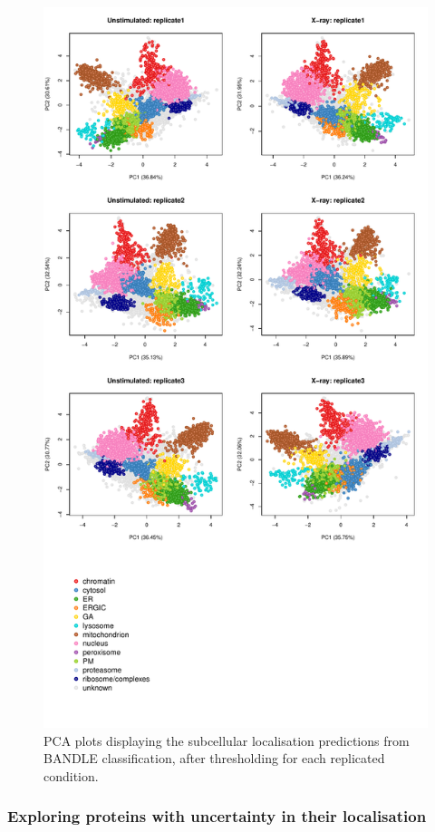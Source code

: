 \documentclass[9pt,a4paper,]{extarticle}
\begin{document}
\begin{figure}[H]

{\centering \includegraphics[width=0.8\linewidth,]{figs/bandle_prediction_maps} 

}

\caption{PCA plots displaying the subcellular localisation predictions from BANDLE classification, after thresholding for each replicated condition.}\label{fig:plot-pcas-bandle-all}
\end{figure}

\subsubsection{Exploring proteins with uncertainty in their localisation}\label{exploring-proteins-with-uncertainty-in-their-localisation}
\end{document}

